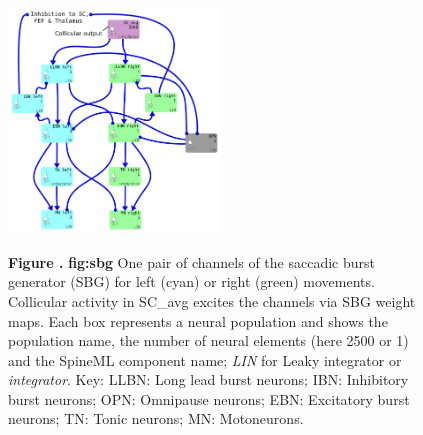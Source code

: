 \documentclass{frontiersSCNS}
\begin{document}
\begin{figure}[h!]
\begin{center}
\includegraphics[width=0.5\textwidth]{./figures/Brain_Stem_1channel.png}
\end{center}
\textbf{\label{fig:sbg} Figure .}
{ \textbf{fig:sbg} One pair of channels of the saccadic burst generator (SBG) for left (cyan)
or right (green) movements. Collicular activity in SC\_avg excites the channels
via SBG weight maps. Each box represents a neural population and shows the
population name, the number of neural elements (here 2500 or 1) and the SpineML
component name; \emph{LIN} for Leaky integrator or \emph{integrator}. Key: LLBN:
Long lead burst neurons; IBN: Inhibitory burst neurons; OPN: Omnipause neurons;
EBN: Excitatory burst neurons; TN: Tonic neurons; MN: Motoneurons.}
\end{figure}
\end{document}
